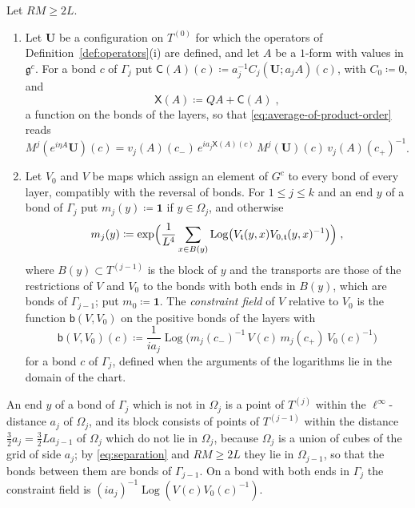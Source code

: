 \documentclass[11pt]{preprint}
\newcommand{\id}{\mathbf 1}
\numberwithin{equation}{section}
\begin{document}
\begin{definition}\label{def:constraint-field}
Let $RM \geqslant 2L$.
\begin{enumerate}[label=(\roman*)]
\item Let $\mathbf U$ be a configuration on $T^{(0)}$ for which the operators of Definition~\ref{def:operators}(i) are defined, and let $A$ be a $1$-form with values in $\mathfrak g^c$. For a bond $c$ of $\Gamma_j$ put $\mathsf C(A)(c) \coloneqq a_j^{-1}C_j(\mathbf U; a_jA)(c)$, with $C_0 \coloneqq 0$, and
\begin{equation}\label{eq:sequence-average}
    \mathsf X(A) \coloneqq QA + \mathsf C(A)\;,
\end{equation}
a function on the bonds of the layers, so that \eqref{eq:average-of-product-order} reads $M^j(e^{i\eta A}\mathbf U)(c) = v_j(A)(c_-)\,e^{ia_j\mathsf X(A)(c)}\,M^j(\mathbf U)(c)\,v_j(A)(c_+)^{-1}$.
\item Let $V_0$ and $V$ be maps which assign an element of $G^c$ to every bond of every layer, compatibly with the reversal of bonds. For $1 \leqslant j \leqslant k$ and an end $y$ of a bond of $\Gamma_j$ put $m_j(y) \coloneqq \id$ if $y \in \Omega_j$, and otherwise
\begin{equation}\label{eq:block-mean-factor}
    m_j(y) \coloneqq \exp\Bigl(\frac{1}{L^4}\sum_{x \in B(y)}\operatorname{Log}\bigl(V_{\mathfrak t}(y, x)V_{0,\mathfrak t}(y, x)^{-1}\bigr)\Bigr)\;,
\end{equation}
where $B(y) \subset T^{(j-1)}$ is the block of $y$ and the transports are those of the restrictions of $V$ and $V_0$ to the bonds with both ends in $B(y)$, which are bonds of $\Gamma_{j-1}$; put $m_0 \coloneqq \id$. The \emph{constraint field} of $V$ relative to $V_0$ is the function $\mathsf b(V, V_0)$ on the positive bonds of the layers with
\begin{equation}\label{eq:constraint-field}
    \mathsf b(V, V_0)(c) \coloneqq \frac{1}{ia_j}\operatorname{Log}\bigl(m_j(c_-)^{-1}\,V(c)\,m_j(c_+)\,V_0(c)^{-1}\bigr)
\end{equation}
for a bond $c$ of $\Gamma_j$, defined when the arguments of the logarithms lie in the domain of the chart.
\end{enumerate}
\end{definition}

An end $y$ of a bond of $\Gamma_j$ which is not in $\Omega_j$ is a point of $T^{(j)}$ within the $\ell^\infty$-distance $a_j$ of $\Omega_j$, and its block consists of points of $T^{(j-1)}$ within the distance $\frac{3}{2}a_j = \frac{3}{2}La_{j-1}$ of $\Omega_j$ which do not lie in $\Omega_j$, because $\Omega_j$ is a union of cubes of the grid of side $a_j$; by \eqref{eq:separation} and $RM \geqslant 2L$ they lie in $\Omega_{j-1}$, so that the bonds between them are bonds of $\Gamma_{j-1}$. On a bond with both ends in $\Gamma_j$ the constraint field is $(ia_j)^{-1}\operatorname{Log}(V(c)V_0(c)^{-1})$.
\end{document}
